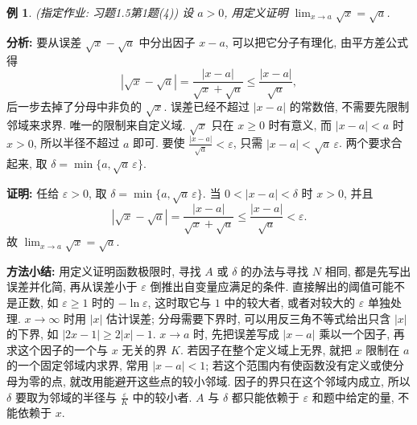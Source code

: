 \documentclass[UTF8,openany]{ctexbook}
\theoremstyle{chinesetextbook}
\newtheorem{example}{例}[section]
\newenvironment{cnproof}{\par\indent\textbf{证明:} \ignorespaces}{\par}
\begin{document}
\begin{example}
\textnormal{(指定作业: 习题1.5第1题(4))} 设 $a>0$, 用定义证明 $\displaystyle\lim_{x\to a}\sqrt x=\sqrt a$.
\end{example}
\par\indent\textbf{分析:} 要从误差 $\sqrt x-\sqrt a$ 中分出因子 $x-a$, 可以把它分子有理化, 由平方差公式得
\[
|\sqrt x-\sqrt a|=\frac{|x-a|}{\sqrt x+\sqrt a}\le\frac{|x-a|}{\sqrt a},
\]
后一步去掉了分母中非负的 $\sqrt x$. 误差已经不超过 $|x-a|$ 的常数倍, 不需要先限制邻域来求界. 唯一的限制来自定义域. $\sqrt x$ 只在 $x\ge0$ 时有意义, 而 $|x-a|<a$ 时 $x>0$, 所以半径不超过 $a$ 即可. 要使 $\displaystyle\frac{|x-a|}{\sqrt a}<\varepsilon$, 只需 $|x-a|<\sqrt a\,\varepsilon$. 两个要求合起来, 取 $\delta=\min\{a,\sqrt a\,\varepsilon\}$.
\begin{cnproof}
任给 $\varepsilon>0$, 取 $\delta=\min\{a,\sqrt a\,\varepsilon\}$. 当 $0<|x-a|<\delta$ 时 $x>0$, 并且
\[
|\sqrt x-\sqrt a|=\frac{|x-a|}{\sqrt x+\sqrt a}\le\frac{|x-a|}{\sqrt a}<\varepsilon.
\]
故 $\displaystyle\lim_{x\to a}\sqrt x=\sqrt a$.
\end{cnproof}
\par\indent\textbf{方法小结:} 用定义证明函数极限时, 寻找 $A$ 或 $\delta$ 的办法与寻找 $N$ 相同, 都是先写出误差并化简, 再从误差小于 $\varepsilon$ 倒推出自变量应满足的条件. 直接解出的阈值可能不是正数, 如 $\varepsilon\ge1$ 时的 $-\ln\varepsilon$, 这时取它与 $1$ 中的较大者, 或者对较大的 $\varepsilon$ 单独处理. $x\to\infty$ 时用 $|x|$ 估计误差; 分母需要下界时, 可以用反三角不等式给出只含 $|x|$ 的下界, 如 $|2x-1|\ge2|x|-1$. $x\to a$ 时, 先把误差写成 $|x-a|$ 乘以一个因子, 再求这个因子的一个与 $x$ 无关的界 $K$. 若因子在整个定义域上无界, 就把 $x$ 限制在 $a$ 的一个固定邻域内求界, 常用 $|x-a|<1$; 若这个范围内有使函数没有定义或使分母为零的点, 就改用能避开这些点的较小邻域. 因子的界只在这个邻域内成立, 所以 $\delta$ 要取为邻域的半径与 $\displaystyle\frac\varepsilon K$ 中的较小者. $A$ 与 $\delta$ 都只能依赖于 $\varepsilon$ 和题中给定的量, 不能依赖于 $x$.
\end{document}
